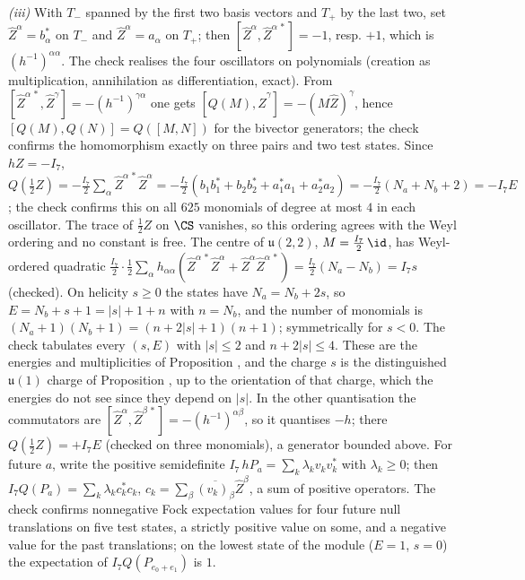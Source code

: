 \emph{(iii)} With $T_{-}$ spanned by the first two basis vectors and $T_{+}$ by the last two, set $\hat Z^{\alpha} = b_{\alpha}^{*}$ on $T_{-}$ and $\hat Z^{\alpha} = a_{\alpha}$ on $T_{+}$; then $[\hat Z^{\alpha}, \hat Z^{\alpha\,*}] = -1$, resp. $+1$, which is $(h^{-1})^{\alpha\alpha}$. The check realises the four oscillators on polynomials (creation as multiplication, annihilation as differentiation, exact). From $[\hat Z^{\alpha\,*}, \hat Z^{\gamma}] = -(h^{-1})^{\gamma\alpha}$ one gets $[Q(M), \hat Z^{\gamma}] = -(M\hat Z)^{\gamma}$, hence $[Q(M), Q(N)] = Q([M, N])$ for the bivector generators; the check confirms the homomorphism exactly on three pairs and two test states. Since $hZ = -I_{7}$, $Q(\tfrac12 Z) = -\tfrac{I_{7}}{2}\sum_{\alpha}\hat Z^{\alpha\,*}\hat Z^{\alpha} = -\tfrac{I_{7}}{2}(b_{1}b_{1}^{*} + b_{2}b_{2}^{*} + a_{1}^{*}a_{1} + a_{2}^{*}a_{2}) = -\tfrac{I_{7}}{2}(N_{a} + N_{b} + 2) = -I_{7}E$; the check confirms this on all $625$ monomials of degree at most $4$ in each oscillator. The trace of $\tfrac12 Z$ on $\CS$ vanishes, so this ordering agrees with the Weyl ordering and no constant is free. The centre of $\mathfrak{u}(2,2)$, $M = \tfrac{I_{7}}{2}\,\id$, has Weyl-ordered quadratic $\tfrac{I_{7}}{2}\cdot\tfrac12\sum_{\alpha}h_{\alpha\alpha}(\hat Z^{\alpha\,*}\hat Z^{\alpha} + \hat Z^{\alpha}\hat Z^{\alpha\,*}) = \tfrac{I_{7}}{2}(N_{a} - N_{b}) = I_{7}s$ (checked). On helicity $s \ge 0$ the states have $N_{a} = N_{b} + 2s$, so $E = N_{b} + s + 1 = |s| + 1 + n$ with $n = N_{b}$, and the number of monomials is $(N_{a} + 1)(N_{b} + 1) = (n + 2|s| + 1)(n + 1)$; symmetrically for $s < 0$. The check tabulates every $(s, E)$ with $|s| \le 2$ and $n + 2|s| \le 4$. These are the energies and multiplicities of Proposition , and the charge $s$ is the distinguished $\mathfrak{u}(1)$ charge of Proposition , up to the orientation of that charge, which the energies do not see since they depend on $|s|$. In the other quantisation the commutators are $[\hat Z^{\alpha}, \hat Z^{\beta\,*}] = -(h^{-1})^{\alpha\beta}$, so it quantises $-h$; there $Q(\tfrac12 Z) = +I_{7}E$ (checked on three monomials), a generator bounded above. For future $a$, write the positive semidefinite $I_{7}\,hP_{a} = \sum_{k}\lambda_{k}v_{k}v_{k}^{*}$ with $\lambda_{k} \ge 0$; then $I_{7}Q(P_{a}) = \sum_{k}\lambda_{k}c_{k}^{*}c_{k}$, $c_{k} = \sum_{\beta}\overline{(v_{k})_{\beta}}\hat Z^{\beta}$, a sum of positive operators. The check confirms nonnegative Fock expectation values for four future null translations on five test states, a strictly positive value on some, and a negative value for the past translations; on the lowest state of the module ($E = 1$, $s = 0$) the expectation of $I_{7}Q(P_{e_{0} + e_{1}})$ is $1$.

